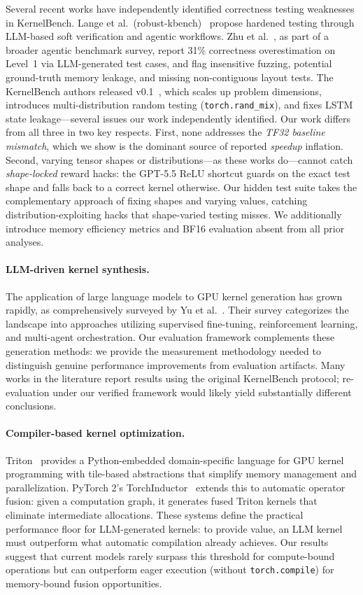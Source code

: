 \documentclass[]{fairmeta}
\begin{document}
Several recent works have independently identified correctness testing weaknesses in KernelBench. Lange et al.\ (robust-kbench)~\citep{robustkbench} propose hardened testing through LLM-based soft verification and agentic workflows. Zhu et al.~\citep{zhu2025abc}, as part of a broader agentic benchmark survey, report 31\% correctness overestimation on Level~1 via LLM-generated test cases, and flag insensitive fuzzing, potential ground-truth memory leakage, and missing non-contiguous layout tests. The KernelBench authors released v0.1~\citep{kernelbenchv01}, which scales up problem dimensions, introduces multi-distribution random testing (\texttt{torch.rand\_mix}), and fixes LSTM state leakage---several issues our work independently identified.
Our work differs from all three in two key respects. First, none addresses the \emph{TF32 baseline mismatch}, which we show is the dominant source of reported \emph{speedup} inflation. Second, varying tensor shapes or distributions---as these works do---cannot catch \emph{shape-locked} reward hacks: the GPT-5.5 ReLU shortcut guards on the exact test shape and falls back to a correct kernel otherwise. Our hidden test suite takes the complementary approach of fixing shapes and varying values, catching distribution-exploiting hacks that shape-varied testing misses. We additionally introduce memory efficiency metrics and BF16 evaluation absent from all prior analyses.

\paragraph{LLM-driven kernel synthesis.}
The application of large language models to GPU kernel generation has grown rapidly, as comprehensively surveyed by Yu et al.~\citep{yu2026automated}. Their survey categorizes the landscape into approaches utilizing supervised fine-tuning, reinforcement learning, and multi-agent orchestration.
Our evaluation framework complements these generation methods: we provide the measurement methodology needed to distinguish genuine performance improvements from evaluation artifacts.
Many works in the literature report results using the original KernelBench protocol;
re-evaluation under our verified framework would likely yield substantially different conclusions.

\paragraph{Compiler-based kernel optimization.}
Triton~\citep{triton} provides a Python-embedded domain-specific language for GPU kernel programming with tile-based abstractions that simplify memory management and parallelization.
PyTorch 2's TorchInductor~\citep{torchinductor} extends this to automatic operator fusion: given a computation graph, it generates fused Triton kernels that eliminate intermediate allocations.
These systems define the practical performance floor for LLM-generated kernels: to provide value, an LLM kernel must outperform what automatic compilation already achieves.
Our results suggest that current models rarely surpass this threshold for compute-bound operations but can outperform eager execution (without \texttt{torch.compile}) for memory-bound fusion opportunities.
\end{document}
